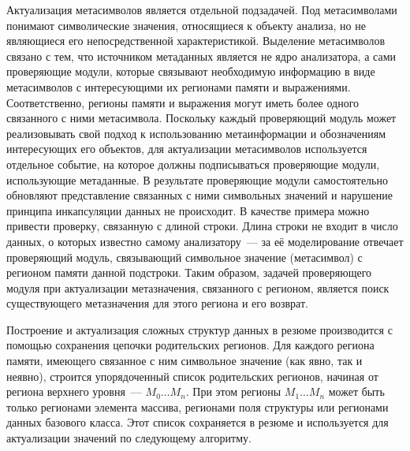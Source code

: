 Актуализация метасимволов является отдельной подзадачей. Под метасимволами понимают символические значения, относящиеся к объекту анализа, но не являющиеся его непосредственной характеристикой. Выделение метасимволов связано с тем, что источником метаданных является не ядро анализатора, а сами проверяющие модули, которые связывают необходимую информацию в виде метасимволов с интересующими их регионами памяти и выражениями. Соответственно, регионы памяти и выражения могут иметь более одного связанного с ними метасимвола. Поскольку каждый проверяющий модуль может реализовывать свой подход к использованию метаинформации и обозначениям интересующих его объектов, для актуализации метасимволов используется отдельное событие, на которое должны подписываться проверяющие модули, использующие метаданные. В результате проверяющие модули самостоятельно обновляют представление связанных с ними символьных значений и нарушение принципа инкапсуляции данных не происходит. В качестве примера можно привести проверку, связанную с длиной строки. Длина строки не входит в число данных, о которых известно самому анализатору~--- за её моделирование отвечает проверяющий модуль, связывающий символьное значение (метасимвол) с регионом памяти данной подстроки. Таким образом, задачей проверяющего модуля при актуализации метазначения, связанного с регионом, является поиск существующего метазначения для этого региона и его возврат.

Построение и актуализация сложных структур данных в резюме производится с помощью сохранения цепочки родительских регионов. Для каждого региона памяти, имеющего связанное с ним символьное значение (как явно, так и неявно), строится упорядоченный список родительских регионов, начиная от региона верхнего уровня~--- $M_0 \ldots M_n$. При этом регионы $M_1 \ldots M_n$  может быть только регионами элемента массива, регионами поля структуры или регионами данных базового класса. Этот список сохраняется в резюме и используется для актуализации значений по следующему алгоритму.

